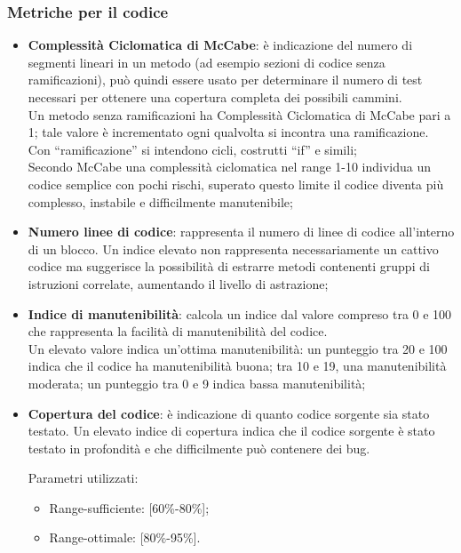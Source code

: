 {\subsubsection{Metriche per il codice}{
	\begin{itemize}
		\item \textbf{Complessità Ciclomatica di McCabe}: è indicazione del numero di segmenti lineari in un metodo (ad esempio sezioni di codice senza ramificazioni), può quindi essere usato per determinare il numero di test necessari per ottenere una copertura completa dei possibili cammini.  \\
		Un metodo senza ramificazioni ha Complessità Ciclomatica di McCabe pari a 1; tale valore è incrementato ogni qualvolta si incontra una ramificazione.  \\
		Con “ramificazione” si intendono cicli, costrutti “if” e simili;\\
		Secondo McCabe una complessità ciclomatica nel range 1-10 individua un codice semplice con pochi rischi, superato questo limite il codice diventa più complesso, instabile e difficilmente manutenibile;
		
		\item \textbf{Numero linee di codice}: rappresenta il numero di linee di codice all'interno di un blocco. 
		Un indice elevato non rappresenta necessariamente un cattivo codice ma suggerisce la possibilità di estrarre metodi contenenti gruppi di istruzioni correlate, aumentando il livello di astrazione;
		
		\item \textbf{Indice di manutenibilità}: calcola un indice dal valore compreso tra 0 e 100 che rappresenta la facilità di manutenibilità del codice.  \\
		Un elevato valore indica un'ottima manutenibilità: un punteggio tra 20 e 100 indica che il codice ha manutenibilità buona; tra 10 e 19, una manutenibilità moderata; un punteggio tra 0 e 9 indica bassa manutenibilità;
		
		\item \textbf{Copertura del codice}: è indicazione di quanto codice sorgente sia stato testato. Un elevato indice di copertura indica che il codice sorgente è stato testato in profondità e che difficilmente può contenere dei bug.
		
		Parametri utilizzati:
		\begin{itemize}
		\item Range-sufficiente: [60\%-80\%];
		\item Range-ottimale: [80\%-95\%].
		\end{itemize}
	\end{itemize}
	}
}
